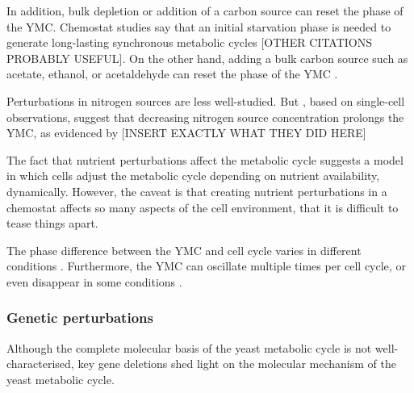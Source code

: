 In addition, bulk depletion or addition of a carbon source can reset the phase of the YMC.
Chemostat studies say that an initial starvation phase is needed to generate long-lasting synchronous metabolic cycles \parencite{tuLogicYeastMetabolic2005} [OTHER CITATIONS PROBABLY USEFUL].
On the other hand, adding a bulk carbon source such as acetate, ethanol, or acetaldehyde can reset the phase of the YMC \citep{kuangMsn2RegulateExpression2017, krishnaMinimalPushPull2018}.

Perturbations in nitrogen sources are less well-studied.
But \textcite{baumgartnerFlavinbasedMetabolicCycles2018}, based on single-cell observations, suggest that decreasing nitrogen source concentration prolongs the YMC, as evidenced by [INSERT EXACTLY WHAT THEY DID HERE]

The fact that nutrient perturbations affect the metabolic cycle suggests a model in which cells adjust the metabolic cycle depending on nutrient availability, dynamically. %
However, the caveat is that creating nutrient perturbations in a chemostat affects so many aspects of the cell environment, that it is difficult to tease things apart.

The phase difference between the YMC and cell cycle varies in different conditions %
\citep{ewaldYeastCyclinDependentKinase2016}. %
Furthermore, the YMC can oscillate multiple times per cell cycle, or even disappear in some conditions \citep{baumgartnerFlavinbasedMetabolicCycles2018}. %

\subsubsection{Genetic perturbations}
\label{subsubsec:intro-ymc-perturbations-genetic}
Although the complete molecular basis of the yeast metabolic cycle is not well-characterised, key gene deletions shed light on the molecular mechanism of the yeast metabolic cycle.

